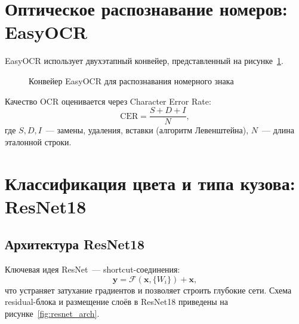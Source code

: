 \documentclass[14pt,a4paper]{report}
\numberwithin{equation}{chapter}
\numberwithin{figure}{chapter}
\numberwithin{table}{chapter}
\begin{document}
\section{Оптическое распознавание номеров: EasyOCR}

EasyOCR использует двухэтапный конвейер, представленный
на рисунке~\ref{fig:ocr_pipeline}.

\begin{figure}[H]
\centering
{}
\caption{Конвейер EasyOCR для распознавания номерного знака}
\label{fig:ocr_pipeline}
\end{figure}

Качество OCR оценивается через Character Error Rate:
\begin{equation}
  \mathrm{CER} = \frac{S + D + I}{N},
\end{equation}
где $S, D, I$~--- замены, удаления, вставки (алгоритм Левенштейна),
$N$~--- длина эталонной строки.

\section{Классификация цвета и типа кузова: ResNet18}

\subsection{Архитектура ResNet18}

Ключевая идея ResNet~--- shortcut-соединения:
\begin{equation}
  \mathbf{y} = \mathcal{F}(\mathbf{x},\{W_i\}) + \mathbf{x},
\end{equation}
что устраняет затухание градиентов и позволяет строить глубокие сети.
Схема residual-блока и размещение слоёв в ResNet18 приведены
на рисунке~\ref{fig:resnet_arch}.
\end{document}
